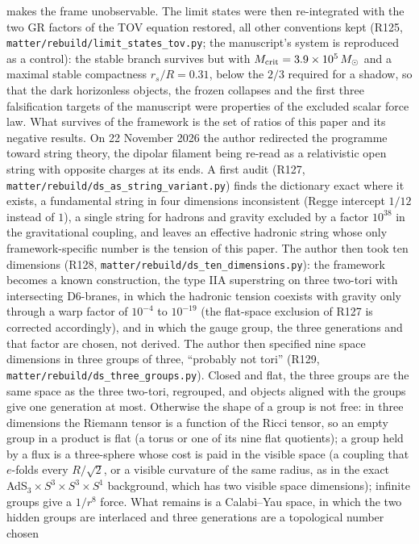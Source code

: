 \documentclass[11pt,a4paper]{article}
\theoremstyle{plain}
\theoremstyle{remark}
\begin{document}
makes the frame unobservable. The limit states were then re-integrated with the two GR factors of the TOV
equation restored, all other conventions kept (R125, \texttt{matter/rebuild/limit\_states\_tov.py}; the manuscript's
system is reproduced as a control): the stable branch survives but with $M_{\rm crit} = 3.9\times10^{5}\,M_\odot$
and a maximal stable compactness $r_s/R = 0.31$, below the $2/3$ required for a shadow, so that the dark horizonless
objects, the frozen collapses and the first three falsification targets of the manuscript were properties of the
excluded scalar force law. What survives of the framework is the set of ratios of this paper and its negative
results. On 22 November 2026 the author redirected the programme toward string theory, the dipolar filament being
re-read as a relativistic open string with opposite charges at its ends. A first audit (R127,
\texttt{matter/rebuild/ds\_as\_string\_variant.py}) finds the dictionary exact where it exists, a fundamental string in
four dimensions inconsistent (Regge intercept $1/12$ instead of $1$), a single string for hadrons and gravity excluded
by a factor $10^{38}$ in the gravitational coupling, and leaves an effective hadronic string whose only
framework-specific number is the tension of this paper. The author then took ten dimensions (R128,
\texttt{matter/rebuild/ds\_ten\_dimensions.py}): the framework becomes a known construction, the type IIA superstring
on three two-tori with intersecting D6-branes, in which the hadronic tension coexists with gravity only through a
warp factor of $10^{-4}$ to $10^{-19}$ (the flat-space exclusion of R127 is corrected accordingly), and in which the
gauge group, the three generations and that factor are chosen, not derived. The author then specified nine space
dimensions in three groups of three, ``probably not tori'' (R129, \texttt{matter/rebuild/ds\_three\_groups.py}).
Closed and flat, the three groups are the same space as the three two-tori, regrouped, and objects aligned with the
groups give one generation at most. Otherwise the shape of a group is not free: in three dimensions the Riemann tensor
is a function of the Ricci tensor, so an empty group in a product is flat (a torus or one of its nine flat quotients);
a group held by a flux is a three-sphere whose cost is paid in the visible space (a coupling that $e$-folds every
$R/\sqrt{2}$, or a visible curvature of the same radius, as in the exact AdS$_3\times S^3\times S^3\times S^1$
background, which has two visible space dimensions); infinite groups give a $1/r^{8}$ force. What remains is a
Calabi--Yau space, in which the two hidden groups are interlaced and three generations are a topological number chosen
\end{document}
